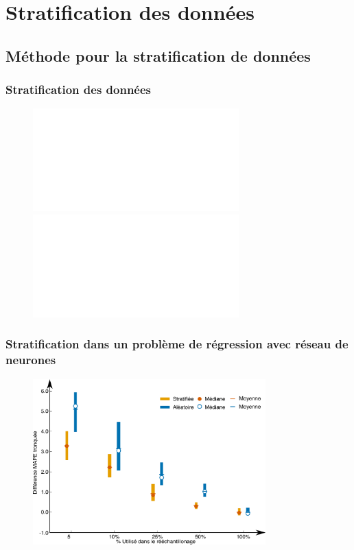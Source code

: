 \documentclass[french]{beamer}
\begin{document}
{\section{Stratification des données}
\subsection{Méthode pour la stratification de données}
\begin{frame}
\frametitle{Stratification des données} 
\begin{figure}
\begin{center}
\includegraphics<1>[width=0.95\linewidth]{figClusteringTrainingFr_222_summer1.pdf}
\includegraphics<2>[width=0.95\linewidth]{figStratEstimFr_222_summer1.pdf}
\end{center}
\end{figure}
\end{frame}
% 
\begin{frame}
\frametitle{Stratification dans un problème de régression avec réseau de neurones} 
\begin{figure}
\begin{center}
\includegraphics[width=0.8\textwidth]{figDiff_ANN_Inp_state_year_2003.pdf}
\end{center}
\end{figure}
\end{frame}

}
\end{document}
